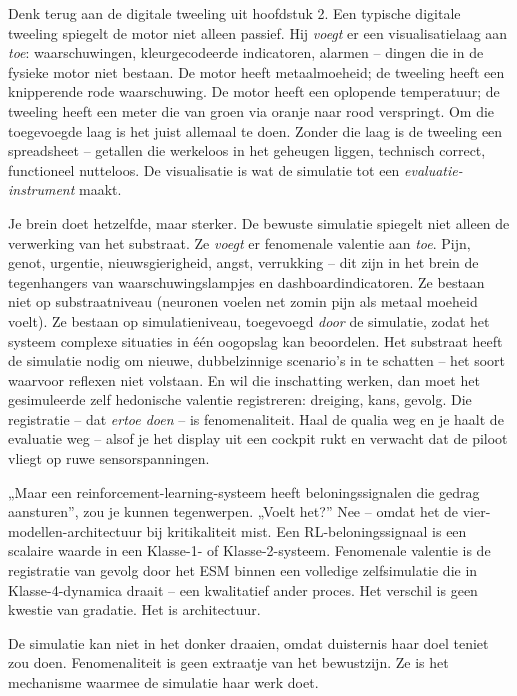\documentclass[11pt, twoside, openright]{book}
\begin{document}
Denk terug aan de digitale tweeling uit hoofdstuk 2. Een typische digitale tweeling spiegelt de motor niet alleen passief. Hij \textit{voegt} er een visualisatielaag aan \textit{toe}: waarschuwingen, kleurgecodeerde indicatoren, alarmen -- dingen die in de fysieke motor niet bestaan. De motor heeft metaalmoeheid; de tweeling heeft een knipperende rode waarschuwing. De motor heeft een oplopende temperatuur; de tweeling heeft een meter die van groen via oranje naar rood verspringt. Om die toegevoegde laag is het juist allemaal te doen. Zonder die laag is de tweeling een spreadsheet -- getallen die werkeloos in het geheugen liggen, technisch correct, functioneel nutteloos. De visualisatie is wat de simulatie tot een \textit{evaluatie-instrument} maakt.

Je brein doet hetzelfde, maar sterker. De bewuste simulatie spiegelt niet alleen de verwerking van het substraat. Ze \textit{voegt} er fenomenale valentie aan \textit{toe}. Pijn, genot, urgentie, nieuwsgierigheid, angst, verrukking -- dit zijn in het brein de tegenhangers van waarschuwingslampjes en dashboardindicatoren. Ze bestaan niet op substraatniveau (neuronen voelen net zomin pijn als metaal moeheid voelt). Ze bestaan op simulatieniveau, toegevoegd \textit{door} de simulatie, zodat het systeem complexe situaties in één oogopslag kan beoordelen. Het substraat heeft de simulatie nodig om nieuwe, dubbelzinnige scenario’s in te schatten -- het soort waarvoor reflexen niet volstaan. En wil die inschatting werken, dan moet het gesimuleerde zelf hedonische valentie registreren: dreiging, kans, gevolg. Die registratie -- dat \textit{ertoe doen} -- is fenomenaliteit. Haal de qualia weg en je haalt de evaluatie weg -- alsof je het display uit een cockpit rukt en verwacht dat de piloot vliegt op ruwe sensorspanningen.

„Maar een reinforcement-learning-systeem heeft beloningssignalen die gedrag aansturen”, zou je kunnen tegenwerpen. „Voelt het?” Nee -- omdat het de vier-modellen-architectuur bij kritikaliteit mist. Een RL-beloningssignaal is een scalaire waarde in een Klasse-1- of Klasse-2-systeem. Fenomenale valentie is de registratie van gevolg door het ESM binnen een volledige zelfsimulatie die in Klasse-4-dynamica draait -- een kwalitatief ander proces. Het verschil is geen kwestie van gradatie. Het is architectuur.

De simulatie kan niet in het donker draaien, omdat duisternis haar doel teniet zou doen. Fenomenaliteit is geen extraatje van het bewustzijn. Ze is het mechanisme waarmee de simulatie haar werk doet.
\end{document}
